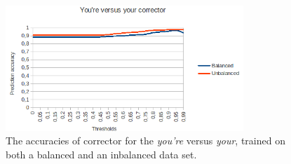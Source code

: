 \documentclass[12pt]{article}
\begin{document}
\begin{figure}[H]
\centering
\includegraphics[width=0.8\textwidth]{accuracy_you'reyour.png}
\caption{The accuracies of corrector for the \emph{you're} versus \emph{your}, trained on both a balanced and an inbalanced data set.}
\end{figure}
\end{document}
